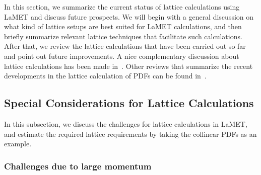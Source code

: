 In this section, we summarize the current status of lattice calculations using LaMET and discuss future prospects.
We will begin with a general discussion on what kind of lattice setups are best suited for
LaMET calculations, and then briefly summarize relevant lattice techniques that facilitate such
calculations. After that, we review the lattice calculations that have been carried out so far and
point out future improvements. A nice complementary discussion about
lattice calculations has been made in~\cite{Cichy:2018mum}. Other reviews that summarize the recent developments in the lattice calculation of PDFs can be found in~\cite{Monahan:2018euv,Zhao:2020vll,Constantinou:2020pek}.

\subsection{Special Considerations for Lattice Calculations}
\label{sec:lattice-lattice}

In this subsection, we discuss the challenges for lattice calculations in LaMET, and estimate the required lattice
requirements by taking the collinear PDFs as an example.

\subsubsection{Challenges due to large momentum}
\label{sec:lattice-lattice-challenges}

